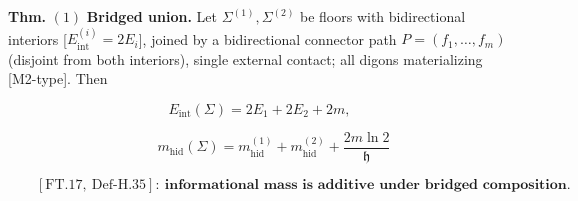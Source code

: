\begin{theorem}\label{tag:FT-50}
\textbf{Thm.} $(1)$ \textbf{Bridged union.} Let $\Sigma^{(1)},\Sigma^{(2)}$ be floors with bidirectional interiors [$E_{\mathrm{int}}^{(i)}=2E_i$], joined by a bidirectional connector path $P=(f_1,\dots,f_m)$ (disjoint from both interiors), single external contact; all digons materializing [M2-type]. Then

\[
E_{\mathrm{int}}(\Sigma)=2E_1+2E_2+2m,
\]

\[
\qquad m_{\mathrm{hid}}(\Sigma)=m_{\mathrm{hid}}^{(1)}+m_{\mathrm{hid}}^{(2)}+\frac{2m\ln2}{\mathfrak h}
\]

\[
\qquad [\mathrm{FT.17},\ \text{Def-H.35}]:\ \textbf{informational mass is additive under bridged composition}.
\]


\end{theorem}
